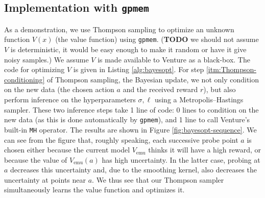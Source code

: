 \documentclass{article} %
\newcommand{\gpmem}{\texttt{gpmem}}
\newcommand{\emu}{{\textrm{emu}}}
\begin{document}
\subsection{Implementation with \gpmem}
As a demonstration, we use Thompson sampling to optimize an unknown function $V(x)$ (the value function) using \gpmem.
(\textbf{TODO} we should not assume $V$ is deterministic, it would be easy enough to make it random or have it give noisy samples.)
We assume $V$ is made available to Venture as a black-box.
The code for optimizing $V$ is given in Listing \ref{alg:bayesopt}.
For step \ref{itm:Thompson-conditioning} of Thompson sampling, the Bayesian update, we not only condition on the new data (the chosen action $a$ and the received reward $r$), but also perform inference on the hyperparameters $\sigma, \ell$ using a Metropolis--Hastings sampler.
These two inference steps take 1 line of code: 0 lines to condition on the new data (as this is done automatically by \gpmem), and 1 line to call Venture's built-in \texttt{MH} operator.
The results are shown in Figure \ref{fig:bayesopt-sequence}.
We can see from the figure that, roughly speaking, each successive probe point $a$ is chosen either because the current model $V_\emu$ thinks it will have a high reward, or because the value of $V_\emu(a)$ has high uncertainty.
In the latter case, probing at $a$ decreases this uncertainty and, due to the smoothing kernel, also decreases the uncertainty at points near $a$.
We thus see that our Thompson sampler simultaneously learns the value function and optimizes it.
\end{document}
